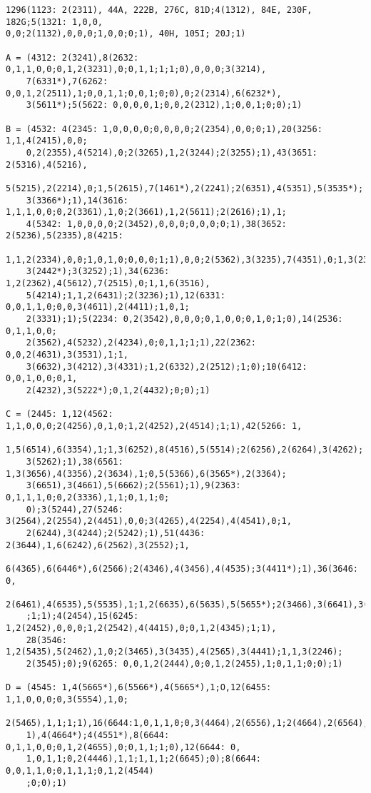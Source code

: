 \begin{verbatim}
1296(1123: 2(2311), 44A, 222B, 276C, 81D;4(1312), 84E, 230F, 182G;5(1321: 1,0,0,
0,0;2(1132),0,0,0;1,0,0;0;1), 40H, 105I; 20J;1)

A = (4312: 2(3241),8(2632: 0,1,1,0,0;0,1,2(3231),0;0,1,1;1;1;0),0,0,0;3(3214),
    7(6331*),7(6262: 0,0,1,2(2511),1;0,0,1,1;0,0,1;0;0),0;2(2314),6(6232*),
    3(5611*);5(5622: 0,0,0,0,1;0,0,2(2312),1;0,0,1;0;0);1)

B = (4532: 4(2345: 1,0,0,0,0;0,0,0,0;2(2354),0,0;0;1),20(3256: 1,1,4(2415),0,0;
    0,2(2355),4(5214),0;2(3265),1,2(3244);2(3255);1),43(3651: 2(5316),4(5216),
    5(5215),2(2214),0;1,5(2615),7(1461*),2(2241);2(6351),4(5351),5(3535*);
    3(3366*);1),14(3616: 1,1,1,0,0;0,2(3361),1,0;2(3661),1,2(5611);2(2616);1),1;
    4(5342: 1,0,0,0,0;2(3452),0,0,0;0,0,0;0;1),38(3652: 2(5236),5(2335),8(4215:
    1,1,2(2334),0,0;1,0,1,0;0,0,0;1;1),0,0;2(5362),3(3235),7(4351),0;1,3(2352),
    3(2442*);3(3252);1),34(6236: 1,2(2362),4(5612),7(2515),0;1,1,6(3516),
    5(4214);1,1,2(6431);2(3236);1),12(6331: 0,0,1,1,0;0,0,3(4611),2(4411);1,0,1;
    2(3331);1);5(2234: 0,2(3542),0,0,0;0,1,0,0;0,1,0;1;0),14(2536: 0,1,1,0,0;
    2(3562),4(5232),2(4234),0;0,1,1;1;1),22(2362: 0,0,2(4631),3(3531),1;1,
    3(6632),3(4212),3(4331);1,2(6332),2(2512);1;0);10(6412: 0,0,1,0,0;0,1,
    2(4232),3(5222*);0,1,2(4432);0;0);1)

C = (2445: 1,12(4562: 1,1,0,0,0;2(4256),0,1,0;1,2(4252),2(4514);1;1),42(5266: 1,
    1,5(6514),6(3354),1;1,3(6252),8(4516),5(5514);2(6256),2(6264),3(4262);
    3(5262);1),38(6561: 1,3(3656),4(3356),2(3634),1;0,5(5366),6(3565*),2(3364);
    3(6651),3(4661),5(6662);2(5561);1),9(2363: 0,1,1,1,0;0,2(3336),1,1;0,1,1;0;
    0);3(5244),27(5246: 3(2564),2(2554),2(4451),0,0;3(4265),4(2254),4(4541),0;1,
    2(6244),3(4244);2(5242);1),51(4436: 2(3644),1,6(6242),6(2562),3(2552);1,
    6(4365),6(6446*),6(2566);2(4346),4(3456),4(4535);3(4411*);1),36(3646: 0,
    2(6461),4(6535),5(5535),1;1,2(6635),6(5635),5(5655*);2(3466),3(6641),3(5635)
    ;1;1);4(2454),15(6245: 1,2(2452),0,0,0;1,2(2542),4(4415),0;0,1,2(4345);1;1),
    28(3546: 1,2(5435),5(2462),1,0;2(3465),3(3435),4(2565),3(4441);1,1,3(2246);
    2(3545);0);9(6265: 0,0,1,2(2444),0;0,1,2(2455),1;0,1,1;0;0);1)

D = (4545: 1,4(5665*),6(5566*),4(5665*),1;O,12(6455: 1,1,0,0,0;0,3(5554),1,0;
    2(5465),1,1;1;1),16(6644:1,0,1,1,0;0,3(4464),2(6556),1;2(4664),2(6564),1;1;
    1),4(4664*);4(4551*),8(6644: 0,1,1,0,0;0,1,2(4655),0;0,1,1;1;0),12(6644: 0,
    1,0,1,1;0,2(4446),1,1;1,1,1;2(6645);0);8(6644: 0,0,1,1,0;0,1,1,1;0,1,2(4544)
    ;0;0);1)


\end{verbatim}
